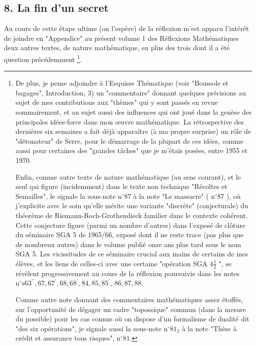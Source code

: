 \subsection{8. La fin d'un secret}

Au cours de cette étape ultime (on l'espère) de la réflexion m'est apparu l'intérêt de joindre en "Appendice" au présent volume 1 des Réflexions Mathématiques deux autres textes, de nature mathématique, en plus des trois dont il a été question précédemment \footnote{De plus, je pense adjoindre à l'Esquisse Thématique (voir "Boussole et bagages", Introduction, 3) un "commentaire" donnant quelques précisions au sujet de mes contributions aux "thèmes" qui y sont passés en revue sommairement, et au sujet aussi des influences qui ont joué dans la genèse des principales idées-force dans mon œuvre mathématique. La rétrospective des dernières six semaines a fait déjà apparaître (à ma propre surprise) un rôle de "détonateur" de Serre, pour le démarrage de la plupart de ces idées, comme aussi pour certaines des "grandes tâches" que je m'étais posées, entre 1955 et 1970.

Enfin, comme autre texte de nature mathématique (au sens courant), et le seul qui figure (incidemment) dans le texte non technique "Récoltes et Semailles", le signale la sous-note $\mathrm{n}^{\circ} 87$ à la note "Le massacre" ( $\mathrm{n}^{\circ} 87$ ), où j'explicite avec le soin qu'elle mérite une variante "discrète" (conjecturale) du théorème de Riemann-Roch-Grothendieck familier dans le contexte cohérent. Cette conjecture figure (parmi un nombre d'autres) dans l'exposé de clôture du séminaire SGA 5 de 1965/66, exposé dont il ne reste trace (pas plus que de nombreux autres) dans le volume publié onze ans plus tard sous le nom SGA 5. Les vicissitudes de ce séminaire crucial aux mains de certains de mes élèves, et les liens de celles-ci avec une certaine "opération SGA $4 \frac{1}{2}$ ", se révèlent progressivement au cours de la réflexion poursuivie dans les notes $\mathrm{n}^{\circ} \mathrm{s} 63^{\prime \prime}, 67,67^{\prime}, 68,68^{\prime}, 84,85,85^{\prime}$, $86,87,88$.

Comme autre note donnant des commentaires mathématiques assez étoffés, sur l'opportunité de dégager un cadre "topossique" commun (dans la mesure du possible) pour les cas connus où on dispose d'un formalisme de dualité dit "des six opérations", je signale aussi la sous-note $\mathrm{n}^{\circ} 81_{2}$ à la note "Thèse à crédit et assurance tous risques", $\mathrm{n}^{\circ} 81$.}.

